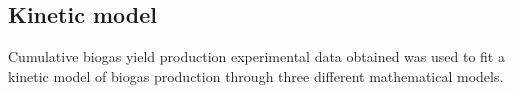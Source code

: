 \subsection{Kinetic model}
Cumulative biogas yield production experimental data obtained was used to fit a kinetic model of biogas production through three different mathematical models.
